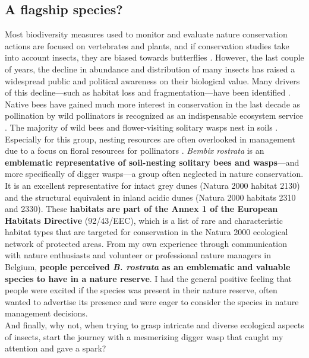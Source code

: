 \documentclass[10pt, twoside]{book} %
\begin{document}
	\subsection{A flagship species?}
	Most biodiversity measures used to monitor and evaluate nature conservation actions are focused on vertebrates and plants, and if conservation studies take into account insects, they are biased towards butterflies \citep{clark2002}. However, the last couple of years, the decline in abundance and distribution of many insects has raised a widespread public and political awareness on their biological value. Many drivers of this decline---such as habitat loss and fragmentation---have been identified \citep{cardoso2020, harvey2020, didham2020, wagner2021, welti2021}. Native bees have gained much more interest in conservation in the last decade as pollination by wild pollinators is recognized as an indispensable ecosystem service \citep{potts2016}. The majority of wild bees and flower-visiting solitary wasps nest in soils \citep{cope2019, antoine2021}. Especially for this group, nesting resources are often overlooked in management due to a focus on floral resources for pollinators \citep{kimoto2012, buckles2019}. \textit{Bembix rostrata} is an \textbf{emblematic representative of soil-nesting solitary bees and wasps}---and more specifically of digger wasps---a group often neglected in nature conservation. It is an excellent representative for intact grey dunes (Natura 2000 habitat 2130) and the structural equivalent in inland acidic dunes (Natura 2000 habitats 2310 and 2330). These \textbf{habitats are part of the Annex 1 of the European Habitats Directive} (92/43/EEC), which is a list of rare and characteristic habitat types that are targeted for conservation in the Natura 2000 ecological network of protected areas. From my own experience through communication with nature enthusiasts and volunteer or professional nature managers in Belgium, \textbf{people perceived \textit{B. rostrata} as an emblematic and valuable species to have in a nature reserve}. I had the general positive feeling that people were excited if the species was present in their nature reserve, often wanted to advertise its presence and were eager to consider the species in nature management decisions.\\
	
	And finally, why not, when trying to grasp intricate and diverse ecological aspects of insects, start the journey with a mesmerizing digger wasp that caught my attention and gave a spark?\\
	\newpage
	
\end{document}
